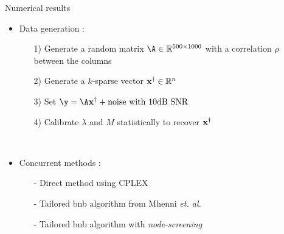 \documentclass[final]{beamer}
\newlength{\onecolwid}
\newcommand{\emphone}[1]{\textit{\color{norange}#1}}
\begin{document}
\begin{frame}[t]
\begin{columns}[t]
\begin{column}{\onecolwid}
    \begin{block}{Numerical results}
        \begin{itemize}
            \item \hspace{0.1in} Data generation :
            \begin{itemize}
                \normalsize \item[1)] \hspace{0.1in} \normalsize Generate a random matrix $\dic \in \kR^{500\times1000}$ with a correlation $\rho$ between the columns
                \item[2)] \hspace{0.1in} \normalsize Generate a $k$-sparse vector $\pv^{\dagger} \in \kR^{\pdim}$
                \item[3)] \hspace{0.1in} \normalsize Set $\obs = \dic\pv^{\dagger} + \text{noise with 10dB SNR}$
                \item[4)] \hspace{0.1in} \normalsize Calibrate $\lambda$ and $M$ statistically to recover $\mathbf{x}^{\dagger}$
            \end{itemize}
        \end{itemize}
        ~\\
        \begin{itemize}
            \item \hspace{0.1in} Concurrent methods :
            \begin{itemize}
                \normalsize \item[-] \hspace{0.1in} \normalsize Direct method using CPLEX
                \item[-] \hspace{0.1in} \normalsize Tailored \gls{bnb} algorithm from Mhenni \textit{et. al.} 
                \item[-] \hspace{0.1in} \normalsize Tailored \gls{bnb} algorithm with \emphone{node-screening}
            \end{itemize}
        \end{itemize}

        \vspace{0.5in}
        


\end{block}
\end{column}
\end{columns}
\end{frame}
\end{document}
